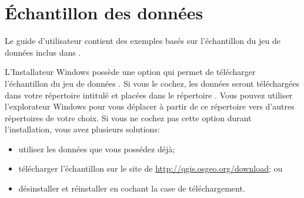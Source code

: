 \section{Échantillon des données}\label{label_sampledata}


Le guide d'utilisateur contient des exemples basés sur l'échantillon du jeu de données inclus dans \qg.
\par
\win L'Installateur Windows possède une option qui permet de télécharger l'échantillon du jeu de données \qg.
Si vous le cochez, les données seront téléchargées dans votre répertoire intitulé  et placées dans le répertoire . Vous pouvez utiliser l'explorateur Windows pour vous déplacer à partir de ce répertoire vers d'autres répertoires de votre choix.
Si vous ne cochez pas cette option durant l'installation, vous avez plusieurs solutions:
\begin{itemize}[label=--]
\item utilisez les données que vous possédez déjà;
\item télécharger l'échantillon sur le site de \qg
 \url{http://qgis.osgeo.org/download}; ou
 \item désinstaller et réinstaller \qg en cochant la case de téléchargement.
\end{itemize}
\par\bigskip

